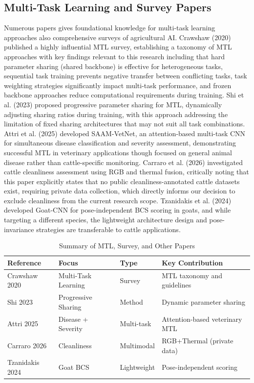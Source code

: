 \subsection{Multi-Task Learning and Survey Papers}

Numerous papers gives foundational knowledge for multi-task learning approaches also comprehensive surveys of agricultural AI. Crawshaw (2020) \cite{crawshaw2020mtl} published a highly influential MTL survey, establishing a taxonomy of MTL approaches with key findings relevant to this research including that hard parameter sharing (shared backbone) is effective for heterogeneous tasks, sequential task training prevents negative transfer between conflicting tasks, task weighting strategies significantly impact multi-task performance, and frozen backbone approaches reduce computational requirements during training. Shi et al. (2023) \cite{shi2023progressive} proposed progressive parameter sharing for MTL, dynamically adjusting sharing ratios during training, with this approach addressing the limitation of fixed sharing architectures that may not suit all task combinations. Attri et al. (2025) \cite{attri2025saamvetnet} developed SAAM-VetNet, an attention-based multi-task CNN for simultaneous disease classification and severity assessment, demonstrating successful MTL in veterinary applications though focused on general animal disease rather than cattle-specific monitoring. Carraro et al. (2026) \cite{carraro2026cleanliness} investigated cattle cleanliness assessment using RGB and thermal fusion, critically noting that this paper explicitly states that no public cleanliness-annotated cattle datasets exist, requiring private data collection, which directly informs our decision to exclude cleanliness from the current research scope. Tzanidakis et al. (2024) \cite{tzanidakis2024goatcnn} developed Goat-CNN for pose-independent BCS scoring in goats, and while targeting a different species, the lightweight architecture design and pose-invariance strategies are transferable to cattle applications.

\begin{table}[h]
\centering
\caption{Summary of MTL, Survey, and Other Papers}
\label{tab:mtl_papers}
\begin{tabular}{|p{3.2cm}|p{3.5cm}|p{2.2cm}|p{4.5cm}|}
\hline
\textbf{Reference} & \textbf{Focus} & \textbf{Type} & \textbf{Key Contribution} \\
\hline
Crawshaw 2020 & Multi-Task Learning & Survey & MTL taxonomy and guidelines \\
\hline
Shi 2023 & Progressive Sharing & Method & Dynamic parameter sharing \\
\hline
Attri 2025 & Disease + Severity & Multi-task & Attention-based veterinary MTL \\
\hline
Carraro 2026 & Cleanliness & Multimodal & RGB+Thermal (private data) \\
\hline
Tzanidakis 2024 & Goat BCS & Lightweight & Pose-independent scoring \\
\hline
\end{tabular}
\end{table}

